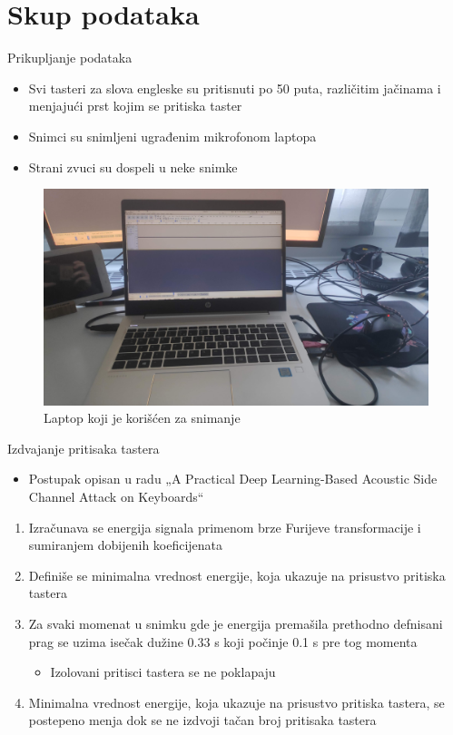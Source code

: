 \documentclass{beamer}
\begin{document}
\section{Skup podataka}
\begin{frame}{Prikupljanje podataka}
    \begin{itemize}
        \item Svi tasteri za slova engleske su pritisnuti po 50 puta, različitim jačinama i menjajući prst kojim se pritiska taster
        \item Snimci su snimljeni ugrađenim mikrofonom laptopa
        \item Strani zvuci su dospeli u neke snimke
    \end{itemize}
    \begin{figure}
        \centering
        \includegraphics[scale=0.045]{Recording setup.jpg}
        \centering
        \captionsetup{justification=centering}
        \caption{Laptop koji je korišćen za snimanje}
        \label{fig:my_label}
    \end{figure}
\end{frame}

\begin{frame}{Izdvajanje pritisaka tastera}
    \begin{itemize}
        \item Postupak opisan u radu „A Practical Deep Learning-Based Acoustic Side
Channel Attack on Keyboards“
    \end{itemize}
    \begin{enumerate}
        \item Izračunava se energija signala primenom brze Furijeve transformacije i sumiranjem dobijenih koeficijenata
        \item Definiše se minimalna vrednost energije, koja ukazuje na prisustvo pritiska tastera
        \item Za svaki momenat u snimku gde je energija premašila prethodno defnisani prag se uzima isečak dužine 0.33 s koji počinje 0.1 s pre tog momenta
        \begin{itemize}
            \item Izolovani pritisci tastera se ne poklapaju
        \end{itemize}
        \item Minimalna vrednost energije, koja ukazuje na prisustvo pritiska tastera, se postepeno menja dok se ne izdvoji tačan broj pritisaka tastera
    \end{enumerate}
\end{frame}
\end{document}

